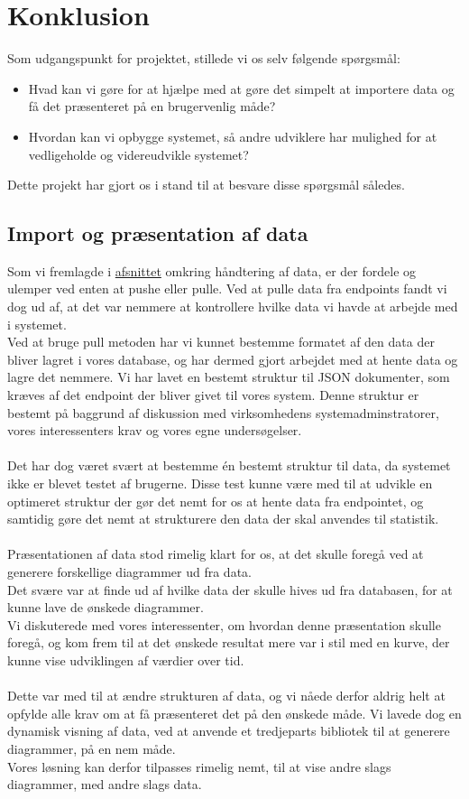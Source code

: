 \section{Konklusion}
Som udgangspunkt for projektet, stillede vi os selv følgende spørgsmål:
\begin{itemize}
    \item{Hvad kan vi gøre for at hjælpe med at gøre det simpelt at importere data og få det præsenteret på en brugervenlig måde?}
    \item{Hvordan kan vi opbygge systemet, så andre udviklere har mulighed for at vedligeholde og videreudvikle systemet?}
\end{itemize}
Dette projekt har gjort os i stand til at besvare disse spørgsmål således.
\subsection{Import og præsentation af data}
Som vi fremlagde i \hyperlink{push-or-pull}{afsnittet} omkring håndtering af data, er der fordele og ulemper ved enten at pushe
eller pulle. Ved at pulle data fra endpoints fandt vi dog ud af, at det var nemmere at kontrollere hvilke data vi havde at arbejde
med i systemet.
\\
Ved at bruge pull metoden har vi kunnet bestemme formatet af den data der bliver lagret i vores database, og har dermed gjort arbejdet med at hente data og lagre det nemmere.
Vi har lavet en bestemt struktur til JSON dokumenter, som kræves af det endpoint der bliver givet til vores system.
Denne struktur er bestemt på baggrund af diskussion med virksomhedens systemadminstratorer, vores interessenters krav og vores egne undersøgelser.
\\\\
Det har dog været svært at bestemme én bestemt struktur til data, da systemet ikke er blevet testet af brugerne.
Disse test kunne være med til at udvikle en optimeret struktur der gør det nemt for os at hente data fra endpointet,
og samtidig gøre det nemt at strukturere den data der skal anvendes til statistik.
\\\\
Præsentationen af data stod rimelig klart for os, at det skulle foregå ved at generere forskellige diagrammer ud fra data.
\\
Det svære var at finde ud af hvilke data der skulle hives ud fra databasen, for at kunne lave de ønskede diagrammer.
\\
Vi diskuterede med vores interessenter, om hvordan denne præsentation skulle foregå, og kom frem til at det ønskede resultat
mere var i stil med en kurve, der kunne vise udviklingen af værdier over tid.
\\\\
Dette var med til at ændre strukturen af data, og vi nåede derfor aldrig helt at opfylde alle krav om at få præsenteret
det på den ønskede måde.
Vi lavede dog en dynamisk visning af data, ved at anvende et tredjeparts bibliotek til at generere diagrammer, på en nem måde.
\\
Vores løsning kan derfor tilpasses rimelig nemt, til at vise andre slags diagrammer, med andre slags data.
